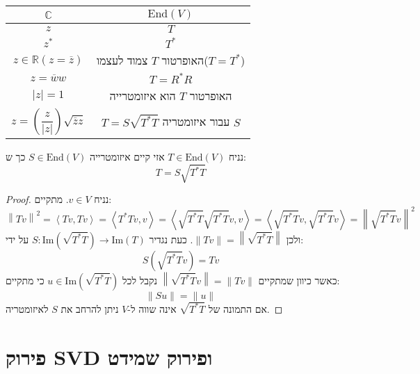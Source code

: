 \documentclass{tstextbook}
\begin{document}
\begin{table}[htbp]
  \centering
  \begin{tabular}{|cc|}
    \hline
    \(\mathbb{C}\) & \(\mathrm{End}(V)\) \\ \hline
    \(z\) & \(T\) \\ \hline
    \(z^{*}\) & \(T^{*}\) \\ \hline
    \(z \in \mathbb{R}\left( z=\overline{z} \right)\) & האופרטור \(T\) צמוד לעצמו(\(T=T^{*}\)) \\ \hline
    \(z=\overline{w}w\) & \(T=R^{*}R\) \\ \hline
    \(\lvert z \rvert=1\) & האופרטור \(T\) הוא איזומטרייה \\ \hline
    $$z = \left( \frac{z}{\lvert z \rvert } \right)\sqrt{ \overline{z} z }$$ & \(T=S\sqrt{ T^{*}T }\) עבור איזומטריה \(S\) \\ \hline
  \end{tabular}
\end{table}
\begin{theorem}
נניח \(T \in \mathrm{End}(V)\) אזי קיים איזומטרייה \(S \in \mathrm{End}(V)\) כך ש:
$$T=S\sqrt{ T^{*}T }$$

\end{theorem}
\begin{proof}
נניח \(v \in V\). מתקיים:
$$\left\|T v \right\|^{2}=\left\langle T v ,T v \right\rangle =\left\langle T^{\ast}T v , v \right\rangle=\left\langle\sqrt{T^{\ast}T}\sqrt{T^{\ast}T} v , v \right\rangle =\left\langle\sqrt{T^{\ast}T} v ,\sqrt{T^{\ast}T} v \right\rangle=\left\|\sqrt{T^{\ast}T} v \right\|^{2}$$
ולכן \(\lVert Tv \rVert=\left\lVert  \sqrt{ T^{*}T }  \right\rVert\). כעת נגדיר \(S:\mathrm{Im}\left( \sqrt{ T^{*}T } \right)\to \mathrm{Im}(T)\) על ידי:
$$S\left( \sqrt{ T^{*}T } v\right)=Tv$$
כאשר כיוון שמתקיים \(\left\lVert  \sqrt{ T^{*}T }v  \right\rVert=\lVert Tv \rVert\) נקבל לכל \(u \in \mathrm{Im}\left( \sqrt{ T^{*}T } \right)\) כי מתקיים:
$$\lVert Su \rVert =\lVert u \rVert $$
אם התמונה של \(\sqrt{ T^{*}T }\) אינה שווה ל-\(V\) ניתן להרחב את \(S\) לאיזומטריה.

\end{proof}
\section{פירוק SVD ופירוק שמידט}
\end{document}
